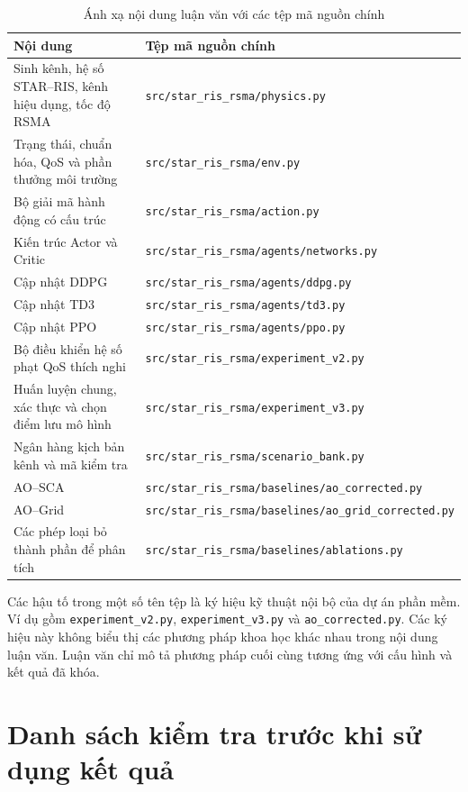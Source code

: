 \begin{table}[htbp]
\centering
\caption{Ánh xạ nội dung luận văn với các tệp mã nguồn chính}
\label{tab:b-anh-xa}
\footnotesize
\begin{tabularx}{\textwidth}{@{}X l@{}}
\toprule
\textbf{Nội dung} & \textbf{Tệp mã nguồn chính} \\
\midrule
Sinh kênh, hệ số STAR--RIS, kênh hiệu dụng, tốc độ RSMA & \texttt{src/star\_ris\_rsma/physics.py} \\
Trạng thái, chuẩn hóa, QoS và phần thưởng môi trường & \texttt{src/star\_ris\_rsma/env.py} \\
Bộ giải mã hành động có cấu trúc & \texttt{src/star\_ris\_rsma/action.py} \\
Kiến trúc Actor và Critic & \texttt{src/star\_ris\_rsma/agents/networks.py} \\
Cập nhật DDPG & \texttt{src/star\_ris\_rsma/agents/ddpg.py} \\
Cập nhật TD3 & \texttt{src/star\_ris\_rsma/agents/td3.py} \\
Cập nhật PPO & \texttt{src/star\_ris\_rsma/agents/ppo.py} \\
Bộ điều khiển hệ số phạt QoS thích nghi & \texttt{src/star\_ris\_rsma/experiment\_v2.py} \\
Huấn luyện chung, xác thực và chọn điểm lưu mô hình & \texttt{src/star\_ris\_rsma/experiment\_v3.py} \\
Ngân hàng kịch bản kênh và mã kiểm tra & \texttt{src/star\_ris\_rsma/scenario\_bank.py} \\
AO--SCA & \texttt{src/star\_ris\_rsma/baselines/ao\_corrected.py} \\
AO--Grid & \texttt{src/star\_ris\_rsma/baselines/ao\_grid\_corrected.py} \\
Các phép loại bỏ thành phần để phân tích & \texttt{src/star\_ris\_rsma/baselines/ablations.py} \\
\bottomrule
\end{tabularx}
\end{table}

Các hậu tố trong một số tên tệp là ký hiệu kỹ thuật nội bộ của dự án phần mềm. Ví dụ gồm
\texttt{experiment\_v2.py}, \texttt{experiment\_v3.py} và \texttt{ao\_corrected.py}. Các
ký hiệu này không biểu thị các phương pháp khoa học khác nhau trong nội dung luận văn.
Luận văn chỉ mô tả phương pháp cuối cùng tương ứng với cấu hình và kết quả đã khóa.

\section{Danh sách kiểm tra trước khi sử dụng kết quả}
\label{sec:danh-sach-kiem-tra}

